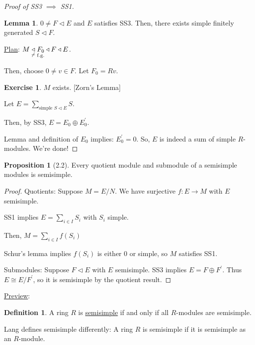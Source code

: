 \documentclass{article}
\theoremstyle{definition}
\newtheorem*{exercise}{Exercise}
\newtheorem*{definition}{Definition}
\newtheorem{proposition}[theorem]{Proposition}
\newtheorem{lemma}[theorem]{Lemma}
\begin{document}
\begin{proof}
    [Proof of SS3 \(\implies\) SS1]

    \begin{lemma}
        \(0 \neq F \triangleleft E\) and \(E\) satisfies SS3. Then, there exists simple finitely generated \(S \triangleleft F\).
    \end{lemma}
    
    \underline{Plan}: \(M \underset{\not-}{\triangleleft} \underset{\text{f.g.}}{F_0} \triangleleft F \triangleleft E\).

    Then, choose \(0 \neq v\in F\). Let \(F_0 = Rv\).

    \begin{exercise}
        \(M\) exists. [Zorn's Lemma]
    \end{exercise}

    Let \(E = \sum_{\text{simple } S \triangleleft E} S\).

    Then, by SS3, \(E = E_0 \oplus E_0^{\prime}\).

    Lemma and definition of \(E_0\) implies: \(E_0^{\prime} = 0\). So, \(E\) is indeed a sum of simple \(R\)-modules. We're done!

\end{proof}

\begin{proposition}
    [2.2] Every quotient module and submodule of a semisimple modules is semisimple.
\end{proposition}

\begin{proof}
    Quotients: Suppose \(M = E / N\). We have surjective \(f: E \to M\) with \(E\) semisimple.

    SS1 implies \(E = \sum_{i\in I} S_i\) with \(S_i\) simple.

    Then, \(M = \sum_{i\in I} f(S_i)\)

    Schur's lemma implies \(f(S_i)\) is either \(0\) or simple, so \(M\) satisfies SS1.

    Submodules: Suppose \(F \triangleleft E\) with \(E\) semisimple. SS3 implies \(E = F \oplus F^{\prime}\). Thus \(E \cong E / F^{\prime}\), so it is semisimple by the quotient result.

\end{proof}

\underline{Preview}:

\begin{definition}

    A ring \(R\) is \underline{semisimple} if and only if all \(R\)-modules are semisimple.

    Lang defines semisimple differently: A ring \(R\) is semisimple if it is semisimple as an \(R\)-module.

\end{definition}
\end{document}
